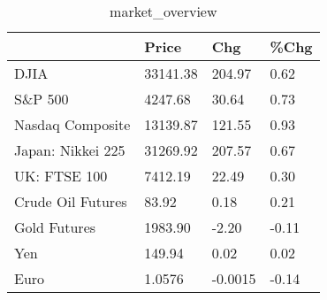 \documentclass{article}%
\begin{document}
%


\begin{table}[htbp]%
\caption{market\_overview}%
\centering%
\begin{adjustbox}{width=1\textwidth}%
\begin{tabular}{llll}
\toprule
                  &    Price &     Chg &  \%Chg \\
\midrule
             DJIA & 33141.38 &  204.97 &  0.62 \\
          S\&P 500 &  4247.68 &   30.64 &  0.73 \\
 Nasdaq Composite & 13139.87 &  121.55 &  0.93 \\
Japan: Nikkei 225 & 31269.92 &  207.57 &  0.67 \\
     UK: FTSE 100 &  7412.19 &   22.49 &  0.30 \\
Crude Oil Futures &    83.92 &    0.18 &  0.21 \\
     Gold Futures &  1983.90 &   -2.20 & -0.11 \\
              Yen &   149.94 &    0.02 &  0.02 \\
             Euro &   1.0576 & -0.0015 & -0.14 \\
\bottomrule
\end{tabular}
%
\end{adjustbox}%
\end{table}

%
\end{document}
